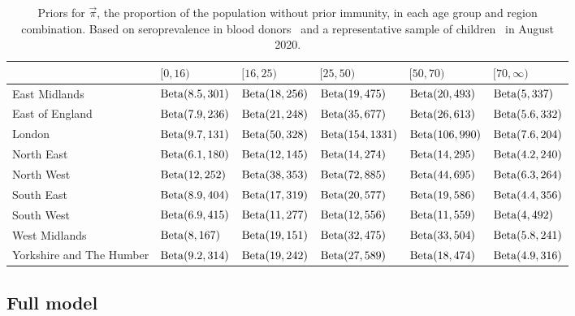 \documentclass[thesis.tex]{subfiles}
\begin{document}
\begin{landscape}
\begin{table}
\centering
\begin{tabular}{l|lllll}
         & $[0,16)$ & $[16,25)$ & $[25,50)$ & $[50,70)$ & $[70,\infty)$ \\
        \hline
        East Midlands & $\operatorname{Beta}(8.5, 301)$ & $\operatorname{Beta}(18, 256)$ & $\operatorname{Beta}(19, 475)$ & $\operatorname{Beta}(20, 493)$ & $\operatorname{Beta}(5, 337)$ \\
        East of England & $\operatorname{Beta}(7.9, 236)$ & $\operatorname{Beta}(21, 248)$ & $\operatorname{Beta}(35, 677)$ & $\operatorname{Beta}(26, 613)$ & $\operatorname{Beta}(5.6, 332)$ \\
        London & $\operatorname{Beta}(9.7, 131)$ & $\operatorname{Beta}(50, 328)$ & $\operatorname{Beta}(154, 1331)$ & $\operatorname{Beta}(106, 990)$ & $\operatorname{Beta}(7.6, 204)$ \\
        North East & $\operatorname{Beta}(6.1, 180)$ & $\operatorname{Beta}(12, 145)$ & $\operatorname{Beta}(14, 274)$ & $\operatorname{Beta}(14, 295)$ & $\operatorname{Beta}(4.2, 240)$ \\
        North West & $\operatorname{Beta}(12, 252)$ & $\operatorname{Beta}(38, 353)$ & $\operatorname{Beta}(72, 885)$ & $\operatorname{Beta}(44, 695)$ & $\operatorname{Beta}(6.3, 264)$ \\
        South East & $\operatorname{Beta}(8.9, 404)$ & $\operatorname{Beta}(17, 319)$ & $\operatorname{Beta}(20, 577)$ & $\operatorname{Beta}(19, 586)$ & $\operatorname{Beta}(4.4, 356)$ \\
        South West & $\operatorname{Beta}(6.9, 415)$ & $\operatorname{Beta}(11, 277)$ & $\operatorname{Beta}(12, 556)$ & $\operatorname{Beta}(11, 559)$ & $\operatorname{Beta}(4, 492)$ \\
        West Midlands & $\operatorname{Beta}(8, 167)$ & $\operatorname{Beta}(19, 151)$ & $\operatorname{Beta}(32, 475)$ & $\operatorname{Beta}(33, 504)$ & $\operatorname{Beta}(5.8, 241)$ \\
        Yorkshire and The Humber & $\operatorname{Beta}(9.2, 314)$ & $\operatorname{Beta}(19, 242)$ & $\operatorname{Beta}(27, 589)$ & $\operatorname{Beta}(18, 474)$ & $\operatorname{Beta}(4.9, 316)$ \\
    \end{tabular}
\caption{Priors for $\vec{\pi}$, the proportion of the population without prior immunity, in each age group and region combination. Based on seroprevalence in blood donors~\autocite{amirthalingamSeroprevalence} and a representative sample of children~\autocite{ratcliffeCommunity} in August 2020.}
\label{SEIR:table:immunity-prior}
\end{table}
\end{landscape}


\subsection{Full model} \label{SEIR:sec:full-model}
\end{document}
